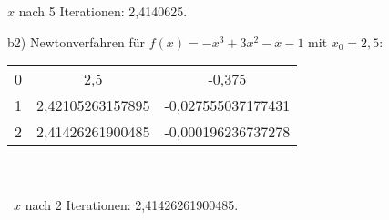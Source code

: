 \documentclass[a4paper,10pt]{article}
\begin{document}
\begin{compactenum}[a)]
\begin{compactenum}
			$x$ nach 5 Iterationen: 2,4140625.\\
			\item [b2)]
			Newtonverfahren für $f(x) = -x^3 + 3x^2 - x - 1$ mit $x_0 = 2,5$:\\
			\begin{tabular}{|ccc|}
				\hline
				0 & 2,5 & -0,375 \\
				1 & 2,42105263157895 & -0,027555037177431 \\
				2 & 2,41426261900485 & -0,000196236737278 \\
				\hline
			\end{tabular}
			\\\\\
			$x$ nach 2 Iterationen: 2,41426261900485.
		\end{compactenum}
	\end{compactenum}
	
\end{document}
